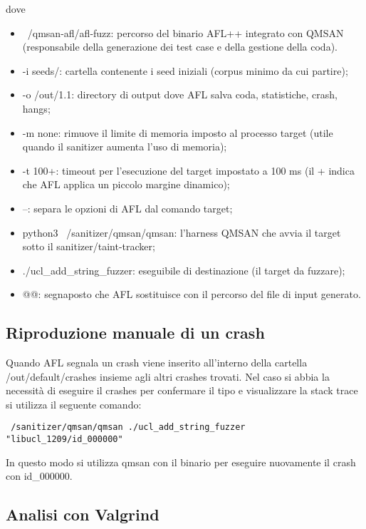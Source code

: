 dove 
\begin{itemize}
    \item ~/qmsan-afl/afl-fuzz: percorso del binario AFL++ integrato con QMSAN (responsabile della generazione dei test case e della gestione della coda).
    \item -i seeds/: cartella contenente i seed iniziali (corpus minimo da cui partire);
    \item -o /out/1.1: directory di output dove AFL salva coda, statistiche, crash, hangs;
    \item -m none: rimuove il limite di memoria imposto al processo target (utile quando il sanitizer aumenta l’uso di memoria);
    \item -t 100+: timeout per l’esecuzione del target impostato a 100 ms (il + indica che AFL applica un piccolo margine dinamico);
    \item --: separa le opzioni di AFL dal comando target;
    \item python3 ~/sanitizer/qmsan/qmsan: l’harness QMSAN che avvia il target sotto il sanitizer/taint-tracker;
    \item ./ucl\_add\_string\_fuzzer: eseguibile di destinazione (il target da fuzzare);
    \item @@: segnaposto che AFL sostituisce con il percorso del file di input generato.
\end{itemize}

\subsection{Riproduzione manuale di un crash}

Quando AFL segnala un crash viene inserito all'interno della cartella /out/default/crashes insieme agli altri crashes trovati. Nel caso si abbia la necessità di eseguire il crashes per confermare il tipo e visualizzare la stack trace si utilizza il seguente comando:

\begin{center}
\texttt{~/sanitizer/qmsan/qmsan ./ucl\_add\_string\_fuzzer "libucl\_1209/id\_000000"
}
\end{center}

In questo modo si utilizza qmsan con il binario per eseguire nuovamente il crash con id\_000000. 

\subsection{Analisi con Valgrind}

